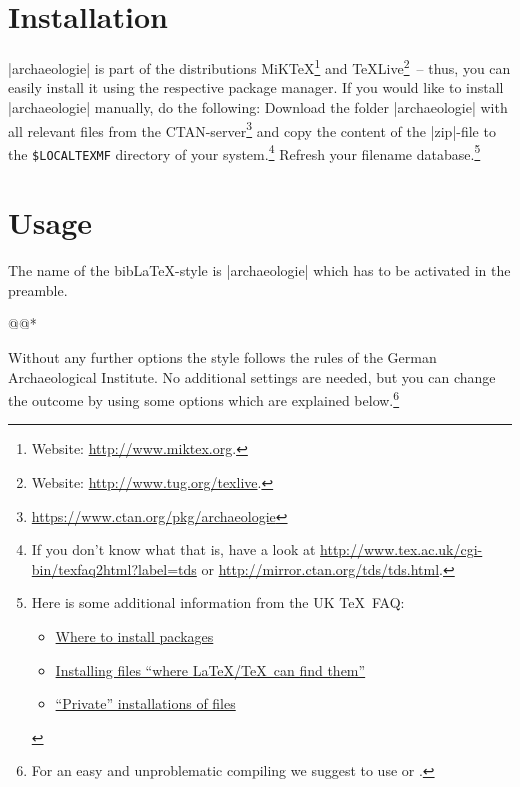 \documentclass[a4paper,
10pt,
greek,
french,
spanish,
italian,
ngerman,
english
]{ltxdoc}
\begin{document}
\section{Installation}
|archaeologie| is part of the distributions MiK\TeX \footnote{Website: \url{http://www.miktex.org}.} 
and \TeX Live\footnote{Website: \url{http://www.tug.org/texlive}.}~-- thus, you
can easily install it using the respective package manager. 
If you would like to
install |archaeologie| manually, do the following:
Download the folder |archaeologie| with all relevant files from the CTAN-server\footnote{\url{https://www.ctan.org/pkg/archaeologie}} and copy the content of the |zip|-file to the \texttt{\$LOCALTEXMF} directory of
 your system.\footnote{If you don't know what that is, have a look at
\url{http://www.tex.ac.uk/cgi-bin/texfaq2html?label=tds} or 
\url{http://mirror.ctan.org/tds/tds.html}.} 
Refresh your filename database.\footnote{ 
Here is some additional information from the UK \TeX\ FAQ:
\begin{itemize}[nosep,after=\vspace{-\baselineskip} ]
  \item \href{%
    http://www.tex.ac.uk/cgi-bin/texfaq2html?label=install-where}{%
    Where to install packages}
  \item \href{%
    http://www.tex.ac.uk/cgi-bin/texfaq2html?label=inst-wlcf}{%
    Installing files \enquote{where \LaTeX /TeX\ can find them}}
  \item \href{%
    http://www.tex.ac.uk/cgi-bin/texfaq2html?label=privinst}{%
    \enquote{Private} installations of files}
\end{itemize}
}

\section{Usage}
   The name of the bib\LaTeX-style is  |archaeologie| which has to be activated in the preamble. 

\begin{code}
\usepackage[style=archaeologie,%
          *@@*]{biblatex}
@@*
\end{code}

Without any further options the style follows the rules of the German Archaeological Institute. 
No additional settings are needed,
but you can change the outcome by using some options which are explained below.\footnote{For an easy and unproblematic compiling we suggest to use  or  .}
\end{document}
